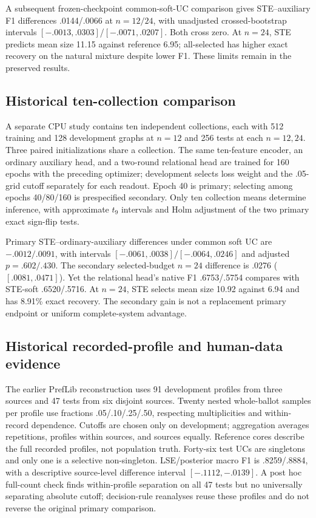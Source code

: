 A subsequent frozen-checkpoint common-soft-UC comparison gives STE--auxiliary F1 differences .0144/.0066 at $n=12/24$, with unadjusted crossed-bootstrap intervals $[-.0013,.0303]$/$[-.0071,.0207]$. Both cross zero. At $n=24$, STE predicts mean size 11.15 against reference 6.95; all-selected has higher exact recovery on the natural mixture despite lower F1. These limits remain in the preserved results.

\subsection{Historical ten-collection comparison}\label{app:confirmation}
A separate CPU study contains ten independent collections, each with 512 training and 128 development graphs at $n=12$ and 256 tests at each $n=12,24$. Three paired initializations share a collection. The same ten-feature encoder, an ordinary auxiliary head, and a two-round relational head are trained for 160 epochs with the preceding optimizer; development selects loss weight and the .05-grid cutoff separately for each readout. Epoch 40 is primary; selecting among epochs 40/80/160 is prespecified secondary. Only ten collection means determine inference, with approximate $t_9$ intervals and Holm adjustment of the two primary exact sign-flip tests.

Primary STE--ordinary-auxiliary differences under common soft UC are $-.0012/.0091$, with intervals $[-.0061,.0038]/[-.0064,.0246]$ and adjusted $p=.602/.430$. The secondary selected-budget $n=24$ difference is .0276 ($[.0081,.0471]$). Yet the relational head's native F1 .6753/.5754 compares with STE-soft .6520/.5716. At $n=24$, STE selects mean size 10.92 against 6.94 and has 8.91\% exact recovery. The secondary gain is not a replacement primary endpoint or uniform complete-system advantage.

\subsection{Historical recorded-profile and human-data evidence}\label{app:profiles-confirmation}
The earlier PrefLib reconstruction \citep{mattei2013preflib,oneill2013openstv,popov2015consensus} uses 91 development profiles from three sources and 47 tests from six disjoint sources. Twenty nested whole-ballot samples per profile use fractions .05/.10/.25/.50, respecting multiplicities and within-record dependence. Cutoffs are chosen only on development; aggregation averages repetitions, profiles within sources, and sources equally. Reference cores describe the full recorded profiles, not population truth. Forty-six test UCs are singletons and only one is a selective non-singleton. LSE/posterior macro F1 is .8259/.8884, with a descriptive source-level difference interval $[-.1112,-.0139]$. A post hoc full-count check finds within-profile separation on all 47 tests but no universally separating absolute cutoff; decision-rule reanalyses reuse these profiles and do not reverse the original primary comparison.

